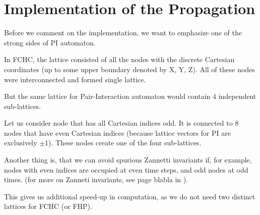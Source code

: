 \section{Implementation of the Propagation}
Before we comment on the implementation, we want to emphasize one of the strong sides of PI automaton.

In FCHC, the lattice consisted of all the nodes with the discrete Cartesian coordinates (up to some upper boundary denoted by X, Y, Z).
All of these nodes were interconnected and formed single lattice.

But the same lattice for Pair-Interaction automaton would contain $4$ independent sub-lattices. 

Let us consider node that has all Cartesian indices odd. It is connected to 8 nodes that have even Cartesian indices (because lattice vectors for PI are exclusively $\pm 1$).
These nodes create one of the four sub-lattices.


Another thing is, that we can avoid spurious Zannetti invariants if, for example, nodes with even indices are occupied at even time steps, and odd nodes at odd times.
(for more on Zanneti invariants, see page blabla in \cite{wolf}).

This gives us additional speed-up in computation, as we do not need two distinct lattices for FCHC (or FHP).

